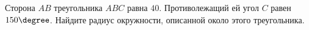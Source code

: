 \begin{ex}
	\begin{condition}
		Сторона \( AB  \) треугольника \( ABC  \) равна \( 40 \). Противолежащий ей угол \( C  \) равен \( 150  \degree\). Найдите радиус окружности, описанной около этого треугольника.
	\end{condition}
\end{ex}